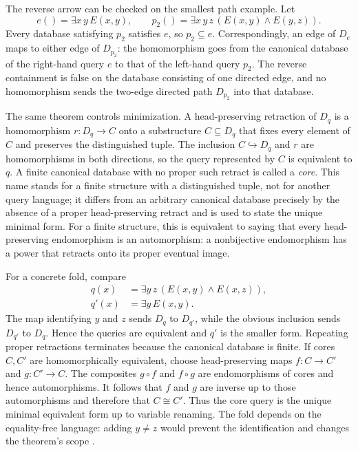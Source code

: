 The reverse arrow can be checked on the smallest path example.  Let
\[
 e()=\exists x\,y\,E(x,y),
 \qquad
 p_2()=\exists x\,y\,z\,(E(x,y)\land E(y,z)).
\]
Every database satisfying \(p_2\) satisfies \(e\), so
\(p_2\subseteq e\).  Correspondingly, an edge of \(D_e\) maps to either edge
of \(D_{p_2}\): the homomorphism goes from the canonical database of the
right-hand query \(e\) to that of the left-hand query \(p_2\).  The reverse
containment is false on the database consisting of one directed edge, and no
homomorphism sends the two-edge directed path \(D_{p_2}\) into that database.

The same theorem controls minimization.  A head-preserving retraction of
\(D_q\) is a homomorphism \(r:D_q\to C\) onto a substructure
\(C\subseteq D_q\) that fixes every element of \(C\) and preserves the
distinguished tuple.  The inclusion \(C\hookrightarrow D_q\) and \(r\) are
homomorphisms in both directions, so the query represented by \(C\) is
equivalent to \(q\).  A finite canonical database with no proper such retract
is called a \emph{core}.  This name stands for a finite structure with a
distinguished tuple, not for another query language; it differs from an
arbitrary canonical database precisely by the absence of a proper
head-preserving retract and is used to state the unique minimal form.
For a finite structure, this is equivalent to saying that every
head-preserving endomorphism is an automorphism: a nonbijective endomorphism
has a power that retracts onto its proper eventual image.

For a concrete fold, compare
\[
\begin{aligned}
 q(x)&=\exists y\,z\,(E(x,y)\land E(x,z)),\\
 q'(x)&=\exists y\,E(x,y).
\end{aligned}
\]
The map identifying \(y\) and \(z\) sends \(D_q\) to \(D_{q'}\), while the
obvious inclusion sends \(D_{q'}\) to \(D_q\).  Hence the queries are equivalent
and \(q'\) is the smaller form.  Repeating proper retractions terminates because
the canonical database is finite.  If cores \(C,C'\) are homomorphically
equivalent, choose head-preserving maps \(f:C\to C'\) and \(g:C'\to C\).
The composites \(g\circ f\) and \(f\circ g\) are endomorphisms of cores and
hence automorphisms.  It follows that \(f\) and \(g\) are inverse up to those
automorphisms and therefore that \(C\cong C'\).  Thus the core query is the
unique minimal equivalent form up to variable renaming.  The fold depends on
the equality-free language: adding \(y\ne z\) would prevent the identification
and changes the theorem's scope
\cite[pp.~81--85]{ChandraMerlin1977}.

